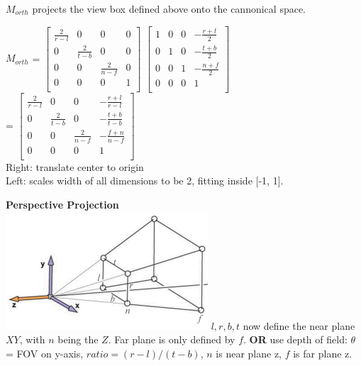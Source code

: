 \documentclass[letterpaper, 8pt]{extarticle}
\begin{document}
\begin{multicols*}{4}
$M_{orth}$ projects the view box defined above onto the cannonical space.


$M_{orth}$ = \(
\begin{bmatrix}
    \frac{2}{r-l} & 0             & 0             & 0 \\
    0             & \frac{2}{t-b} & 0             & 0 \\
    0             & 0             & \frac{2}{n-f} & 0 \\
    0             & 0             & 0             & 1 \\
\end{bmatrix}
\)
\(
\begin{bmatrix}
    1 & 0 & 0 & -\frac{r+l}{2} \\
    0 & 1 & 0 & -\frac{t+b}{2} \\
    0 & 0 & 1 & -\frac{n+f}{2} \\
    0 & 0 & 0 & 1              \\
\end{bmatrix}
\)\\
=
\(
\begin{bmatrix}
    \frac{2}{r-l} & 0             & 0             & -\frac{r+l}{r-l} \\
    0             & \frac{2}{t-b} & 0             & -\frac{t+b}{t-b} \\
    0             & 0             & \frac{2}{n-f} & -\frac{f+n}{n-f} \\
    0             & 0             & 0             & 1                \\
\end{bmatrix}
\)\\
Right: translate center to origin\\
Left: scales width of all dimensions to be 2, fitting inside [-1, 1].

\textbf{Perspective Projection}\\
\includegraphics[width=\linewidth]{cam-persp.png}
$l,r,b,t$ now define the near plane $XY$, with $n$ being the $Z$. Far plane is only defined by $f$.
\textbf{OR} use depth of field:
$\theta$ = FOV on y-axis, $ratio = (r-l)/(t-b)$, $n$ is near plane z, $f$ is far plane z.


\end{multicols*}
\end{document}
